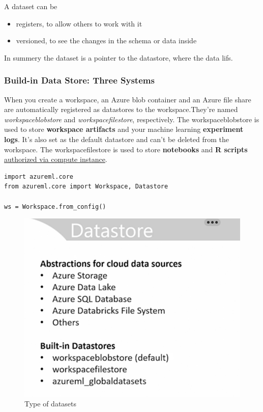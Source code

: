 A dataset can be 
\begin{itemize}
	\item registers, to allow others to work with it 
	\item versioned, to see the changes in the schema or data inside
\end{itemize}

In summery the dataset is a pointer to the datastore, where the data lifs.

\subsubsection{Build-in Data Store: Three Systems}
When you create a workspace, an Azure blob container and an Azure file share are automatically registered as datastores to the workspace.They're named \textit{workspaceblobstore} and \textit{workspacefilestore}, respectively. The workspaceblobstore is used to store \textbf{workspace artifacts} and your machine learning \textbf{experiment logs}. It's also set as the default datastore and can't be deleted from the workspace. The workspacefilestore is used to store \textbf{notebooks} and \textbf{R scripts} \underline{authorized via compute instance}.

\begin{lstlisting}[style=python]
import azureml.core
from azureml.core import Workspace, Datastore
     
ws = Workspace.from_config()	
\end{lstlisting}

\begin{figure}[H]
	\centering
	\includegraphics[scale = 0.3]{attachment/chapter_10/Scc029}
	\caption{Type of datasets}
\end{figure}

